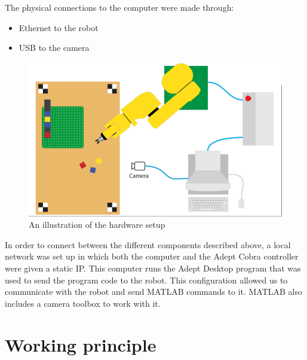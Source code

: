 The physical connections to the computer were made through: 
\begin{itemize}
	\item Ethernet to the robot  
	\item USB to the camera 
\end{itemize}

\begin{figure}[H]
	\centering
	\includegraphics[scale=0.4]{figures/robotCellDesign.png}
	\caption{An illustration of the hardware setup}
\end{figure}

In order to connect between the different components described above, a local network was set up in which both the computer and the Adept Cobra controller were given a static IP. This computer runs the Adept Desktop program that was used to send the program code to the robot. This configuration allowed us to communicate with the robot and send MATLAB commands to it. MATLAB also includes a camera toolbox to work with it. 

\section{Working principle}\label{sec:workiing_principle}

